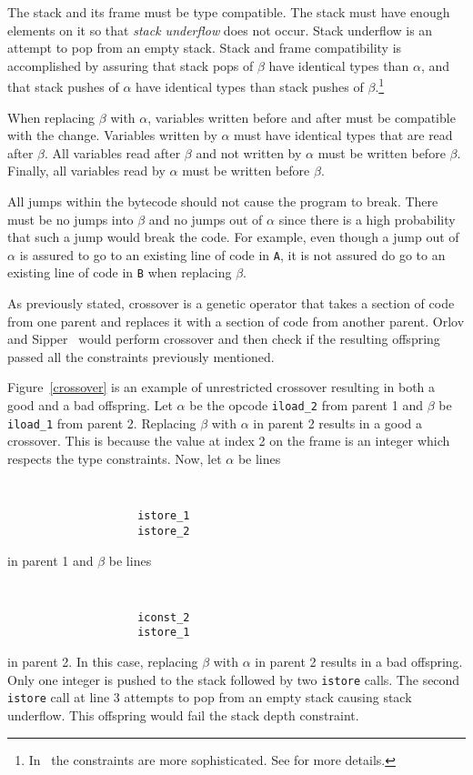 \documentclass{sig-alternate}
\begin{document}
The stack and its frame must be type compatible. The stack must have enough elements on it so that \textit{stack underflow} does not occur. Stack underflow is an attempt to pop from an empty stack. Stack and frame compatibility is accomplished by assuring that stack pops of $\beta$ have identical types than $\alpha$, and that stack pushes of $\alpha$ have identical types than stack pushes of $\beta$.\footnote{In~\cite{FINCH2:2009} the constraints are more sophisticated. See \cite{FINCH2:2009} for more details.} \par

When replacing $\beta$ with $\alpha$, variables written before and after must be compatible with the change. Variables written by $\alpha$ must have identical types that are read after $\beta$. All variables read after $\beta$ and not written by $\alpha$ must be written before $\beta$. Finally, all variables read by $\alpha$ must be written before $\beta$.\par

All jumps within the bytecode should not cause the program to break. There must be no jumps into $\beta$ and no jumps out of $\alpha$ since there is a high probability that such a jump would break the code. For example, even though a jump out of $\alpha$ is assured to go to an existing line of code in \texttt{A}, it is not assured do go to an existing line of code in \texttt{B} when replacing $\beta$.

As previously stated, crossover is a genetic operator that takes a section of code from one parent and replaces it with a section of code from another parent. Orlov and Sipper~\cite{FINCH:2011} would perform crossover and then check if the resulting offspring passed all the constraints previously mentioned.\par 

Figure~\ref{crossover} is an example of unrestricted crossover resulting in both a good and a bad offspring. Let $\alpha$ be the opcode \texttt{iload\_2} from parent 1 and $\beta$ be \texttt{iload\_1} from parent 2. Replacing $\beta$ with $\alpha$ in parent 2 results in a good a crossover. This is because the value at index 2 on the frame is an integer which respects the type constraints. Now, let $\alpha$ be lines
{\tt
\begin{verbatim}
                    istore_1
                    istore_2
\end{verbatim}}

\noindent in parent 1 and $\beta$ be lines
{\tt
\begin{verbatim}
                    iconst_2
                    istore_1
\end{verbatim}}
\noindent 
in parent 2. In this case, replacing $\beta$ with $\alpha$ in parent 2 results in a bad offspring. Only one integer is pushed to the stack followed by two \texttt{istore} calls. The second \texttt{istore} call at line 3 attempts to pop from an empty stack causing stack underflow. This offspring would fail the stack depth constraint.
\end{document}
